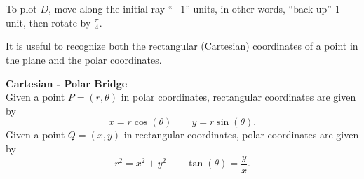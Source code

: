 \documentclass{ximera}
\begin{document}
\begin{example}
\begin{explanation}
  To plot $D$, move along the initial ray ``$-1$'' units, in other
  words, ``back up'' $1$ unit, then rotate
   by
  $\frac{\pi}{4}$.
  \begin{hint}
    \begin{image}
    \end{image}
  \end{hint}
\end{explanation}
\end{example}


















It is useful to recognize both the rectangular (Cartesian)
coordinates of a point in the plane and the polar coordinates.

\begin{theorem}  \textbf{\textcolor{green!50!black}{Cartesian - Polar Bridge}} \\

Given a point $P=(r,\theta)$ in polar coordinates, rectangular
coordinates are given by
\[
x=r\cos(\theta)\qquad y=r\sin(\theta).
\]
Given a point $Q=(x,y)$ in rectangular coordinates, polar coordinates
are given by
\[
r^2=x^2+y^2\qquad \tan(\theta) = \frac{y}{x}.
\]
\end{theorem}
\end{document}
